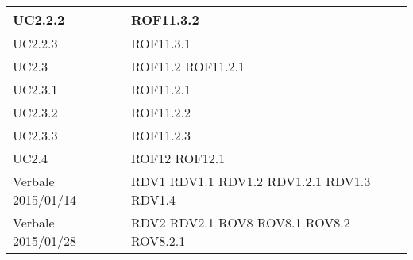 \begin{center}
\begin{longtable}{| p{4cm} | p{4cm} |}
\hline
UC2.2.2 & ROF11.3.2 \\
\hline
UC2.2.3 & ROF11.3.1 \\
\hline
UC2.3 & ROF11.2 \newline ROF11.2.1 \\
\hline
UC2.3.1 & ROF11.2.1 \\
\hline
UC2.3.2 & ROF11.2.2 \\
\hline
UC2.3.3 & ROF11.2.3 \\
\hline
UC2.4 & ROF12 \newline ROF12.1 \\
\hline
Verbale 2015/01/14 & RDV1 \newline RDV1.1 \newline RDV1.2 \newline RDV1.2.1 \newline RDV1.3 \newline RDV1.4 \\
\hline
Verbale 2015/01/28 & RDV2 \newline RDV2.1 \newline ROV8 \newline ROV8.1 \newline ROV8.2 \newline ROV8.2.1 \\
\hline
\end{longtable}
\egroup
\end{center}
